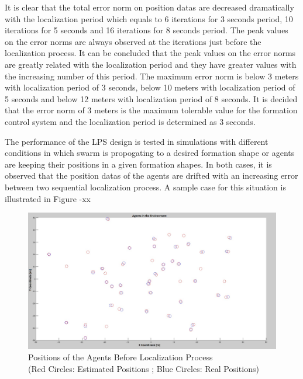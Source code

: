 \documentclass[twoside]{article}
\begin{document}
		
It is clear that the total error norm on position datas are decreased dramatically with the localization period which equals to 6 iterations for 3 seconds period, 10 iterations for 5 seconds and 16 iterations for 8 seconds period. The peak values on the error norms are always observed at the iterations just before the localization process. It can be concluded that the peak values on the error norms are greatly related with the localization period and they have greater values with the increasing number of this period. The maximum error norm is below 3 meters with localization period of 3 seconds, below 10 meters with localization period of 5 seconds and below 12 meters with localization period of 8 seconds. It is decided  that the error norm of 3 meters is the maximum tolerable value for the formation control system and the localization period is determined as 3 seconds. 

The performance of the LPS design is tested in simulations with different conditions in which swarm is propogating to a desired formation shape or agents are keeping their positions in a given formation shapes.  In both cases, it is observed that the position datas of the agents are drifted with an increasing error between two  sequential localization process. A sample case for this situation is illustrated in Figure -xx

	\begin{figure}[H]
		\caption{Positions of the Agents Before Localization Process \\
			       (Red Circles: Estimated Positions ; Blue Circles: Real Positions)}
		\centerline{\includegraphics[scale = 0.30]{Pozisyon-1_Hatali}}
	\end{figure} 
		
\end{document}
